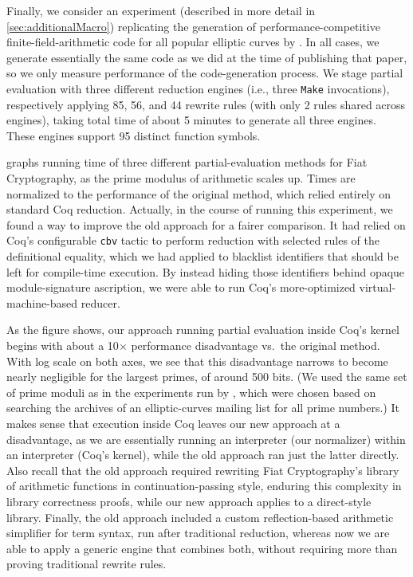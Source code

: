 Finally, we consider an experiment (described in more detail in \autoref{sec:additionalMacro}) replicating the generation of performance-competitive finite-field-arithmetic code for all popular elliptic curves by \textcite{FiatCryptoSP19}.
In all cases, we generate essentially the same code as we did at the time of publishing that paper, so we only measure performance of the code-generation process.
We stage partial evaluation with three different reduction engines (i.e., three \texttt{Make} invocations), respectively applying 85, 56, and 44 rewrite rules (with only 2 rules shared across engines), taking total time of about 5 minutes to generate all three engines.
These engines support 95 distinct function symbols.


 graphs running time of three different partial-evaluation methods for Fiat Cryptography, as the prime modulus of arithmetic scales up.
Times are normalized to the performance of the original method, which relied entirely on standard Coq reduction.
Actually, in the course of running this experiment, we found a way to improve the old approach for a fairer comparison.
It had relied on Coq's configurable \texttt{cbv} tactic to perform reduction with selected rules of the definitional equality, which we had applied to blacklist identifiers that should be left for compile-time execution.
By instead hiding those identifiers behind opaque module-signature ascription, we were able to run Coq's more-optimized virtual-machine-based reducer.

As the figure shows, our approach running partial evaluation inside Coq's kernel begins with about a 10$\times$ performance disadvantage vs.\ the original method.
With log scale on both axes, we see that this disadvantage narrows to become nearly negligible for the largest primes, of around 500 bits.
(We used the same set of prime moduli as in the experiments run by \textcite{FiatCryptoSP19}, which were chosen based on searching the archives of an elliptic-curves mailing list for all prime numbers.)
It makes sense that execution inside Coq leaves our new approach at a disadvantage, as we are essentially running an interpreter (our normalizer) within an interpreter (Coq's kernel), while the old approach ran just the latter directly.
Also recall that the old approach required rewriting Fiat Cryptography's library of arithmetic functions in continuation-passing style, enduring this complexity in library correctness proofs, while our new approach applies to a direct-style library.
Finally, the old approach included a custom reflection-based arithmetic simplifier for term syntax, run after traditional reduction, whereas now we are able to apply a generic engine that combines both, without requiring more than proving traditional rewrite rules.

